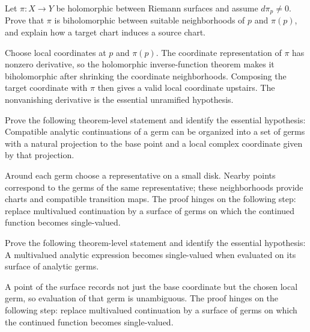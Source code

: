 \begin{problem}\label{prob:iv22-problem-09}
Let $\pi:X\to Y$ be holomorphic between Riemann surfaces and assume $d\pi_p\ne0$. Prove that $\pi$ is biholomorphic between suitable neighborhoods of $p$ and $\pi(p)$, and explain how a target chart induces a source chart.
\end{problem}
\begin{solution}
Choose local coordinates at $p$ and $\pi(p)$. The coordinate representation of $\pi$ has nonzero derivative, so the holomorphic inverse-function theorem makes it biholomorphic after shrinking the coordinate neighborhoods. Composing the target coordinate with $\pi$ then gives a valid local coordinate upstairs. The nonvanishing derivative is the essential unramified hypothesis.
\end{solution}

\begin{problem}\label{prob:iv22-problem-10}
Prove the following theorem-level statement and identify the essential hypothesis: Compatible analytic continuations of a germ can be organized into a set of germs with a natural projection to the base point and a local complex coordinate given by that projection.
\end{problem}
\begin{solution}
Around each germ choose a representative on a small disk. Nearby points correspond to the germs of the same representative; these neighborhoods provide charts and compatible transition maps. The proof hinges on the following step: replace multivalued continuation by a surface of germs on which the continued function becomes single-valued.
\end{solution}

\begin{problem}\label{prob:iv22-problem-11}
Prove the following theorem-level statement and identify the essential hypothesis: A multivalued analytic expression becomes single-valued when evaluated on its surface of analytic germs.
\end{problem}
\begin{solution}
A point of the surface records not just the base coordinate but the chosen local germ, so evaluation of that germ is unambiguous. The proof hinges on the following step: replace multivalued continuation by a surface of germs on which the continued function becomes single-valued.
\end{solution}

